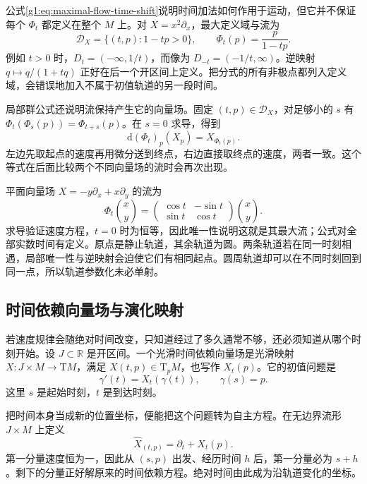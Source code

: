 公式\eqref{g1:eq:maximal-flow-time-shift}说明时间加法如何作用于运动，但它并不保证每个 \(\Phi_t\) 都定义在整个 \(M\) 上。对 \(X=x^2\partial_x\)，最大定义域与流为
\[
	\mathcal D_X=\{(t,p):1-tp>0\},\qquad
	\Phi_t(p)=\frac p{1-tp}.
\]
例如 \(t>0\) 时，\(D_t=(-\infty,1/t)\)，而像为 \(D_{-t}=(-1/t,\infty)\)。逆映射 \(q\mapsto q/(1+tq)\) 正好在后一个开区间上定义。把分式的所有非极点都列入定义域，会错误地加入不属于初值轨道的另一段时间。

\ProseParagraphBreak

局部群公式还说明流保持产生它的向量场。固定 \((t,p)\in\mathcal D_X\)，对足够小的 \(s\) 有 \(\Phi_t(\Phi_s(p))=\Phi_{t+s}(p)\)。在 \(s=0\) 求导，得到
\begin{equation}
	\label{g1:eq:flow-preserves-generator}
	\mathrm{d}(\Phi_t)_p(X_p)=X_{\Phi_t(p)}.
\end{equation}
左边先取起点的速度再用微分送到终点，右边直接取终点的速度，两者一致。这个等式在后面比较两个不同向量场的流时会再次出现。

\begin{example}
	\label{g1:exm:rotation-local-flow}
	平面向量场 \(X=-y\partial_x+x\partial_y\) 的流为
	\[
		\Phi_t\binom{x}{y}
		=\begin{pmatrix}\cos t&-\sin t\\\sin t&\cos t\end{pmatrix}\binom{x}{y}.
	\]
	求导验证速度方程，\(t=0\) 时为恒等，因此唯一性说明这就是其最大流；公式对全部实数时间有定义。原点是静止轨道，其余轨道为圆。两条轨道若在同一时刻相遇，局部唯一性与逆映射会迫使它们有相同起点。圆周轨道却可以在不同时刻回到同一点，所以轨道参数化未必单射。
\end{example}

\subsection{时间依赖向量场与演化映射}
\label{g1:subsec:1301:04}

若速度规律会随绝对时间改变，只知道经过了多久通常不够，还必须知道从哪个时刻开始。设 \(J\subset\mathbb R\) 是开区间。一个光滑时间依赖向量场是光滑映射 \(X:J\times M\to \mathrm{T}M\)，满足 \(X(t,p)\in \mathrm{T}_pM\)，也写作 \(X_t(p)\)。它的初值问题是
\[
	\gamma'(t)=X_t(\gamma(t)),\qquad \gamma(s)=p.
\]
这里 \(s\) 是起始时刻，\(t\) 是到达时刻。

\ProseParagraphBreak

把时间本身当成新的位置坐标，便能把这个问题转为自主方程。在无边界流形 \(J\times M\) 上定义
\[
	\widehat X_{(t,p)}=\partial_t+X_t(p).
\]
第一分量速度恒为一，因此从 \((s,p)\) 出发、经历时间 \(h\) 后，第一分量必为 \(s+h\)。剩下的分量正好解原来的时间依赖方程。绝对时间由此成为沿轨道变化的坐标。


